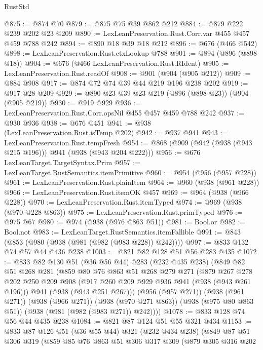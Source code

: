 \begin{lexlean}{RustStd}
\begin{coremodule}
@875 := @874 @70
@879 := @875 @75 @39 @862 @212
@884 := @879 @222 @239 @202 @23 @209
@890 := LexLeanPreservation.Rust.Corr.var @455 @457 @459 @788 @242
@894 := @890 @18 @39 @18 @212
@896 := @676 (@466 @542)
@898 := LexLeanPreservation.Rust.ctxLookup @788
@901 := @894 (@896 (@898 @18))
@904 := @676 (@466 LexLeanPreservation.Rust.RIdent)
@905 := LexLeanPreservation.Rust.readOf
@908 := @901 (@904 (@905 @212))
@909 := @884 @908
@917 := @874 @72 @74 @39 @44 @219 @196 @238 @202
@919 := @917 @28 @209
@929 := @890 @23 @39 @23 @219 (@896 (@898 @23)) (@904 (@905 @219))
@930 := @919 @929
@936 := LexLeanPreservation.Rust.Corr.opsNil @455 @457 @459 @788 @242
@937 := @930 @936
@938 := @676 @451
@941 := @938 (LexLeanPreservation.Rust.isTemp @202)
@942 := @937 @941
@943 := LexLeanPreservation.Rust.tempFresh
@954 := @868 (@909 (@942 (@938 (@943 @215 @196))) @941 (@938 (@943 @204 @222)))
@956 := @676 LexLeanTarget.TargetSyntax.Prim
@957 := LexLeanTarget.RustSemantics.itemPrimitive
@960 := @954 (@956 (@957 @228))
@961 := LexLeanPreservation.Rust.plainItem
@964 := @960 (@938 (@961 @228))
@966 := LexLeanPreservation.Rust.itemOK @457
@969 := @964 (@938 (@966 @228))
@970 := LexLeanPreservation.Rust.itemTyped
@974 := @969 (@938 (@970 @228 @863))
@975 := LexLeanPreservation.Rust.primTyped
@976 := @975 @67
@980 := @974 (@938 (@976 @863 @51))
@981 := Bool.or
@982 := Bool.not
@983 := LexLeanTarget.RustSemantics.itemFallible
@991 := @843 (@853 (@980 (@938 (@981 (@982 (@983 @228)) @242))))
@997 := @833 @132 @74 @57 @44 @436 @238
@1003 := @821 @82 @128 @51 @56 @283 @435
@1072 := @833
    @82
    @130
    @51
    (@36 @56 @44)
    @283
    (@232 @435 @238)
    (@849
      @82
      @51
      @268
      @281
      (@859
        @80
        @76
        @863
        @51
        @268
        @279
        @271
        (@879
          @267
          @278
          @202
          @250
          @209
          @908
          (@917 @260 @209 @929 @936 @941 (@938 (@943 @261 @196)))
          @941
          (@938 (@943 @251 @267)))
        (@956 (@957 @271))
        (@938 (@961 @271))
        (@938 (@966 @271))
        (@938 (@970 @271 @863))
        (@938 (@975 @80 @863 @51))
        (@938 (@981 (@982 (@983 @271)) @242))))
@1078 := @833 @128 @74 @56 @44 @435 @238
@1084 := @821 @87 @124 @51 @55 @321 @434
@1153 := @833
    @87
    @126
    @51
    (@36 @55 @44)
    @321
    (@232 @434 @238)
    (@849
      @87
      @51
      @306
      @319
      (@859
        @85
        @76
        @863
        @51
        @306
        @317
        @309
        (@879
          @305
          @316
          @202

\end{coremodule}
\end{lexlean}
